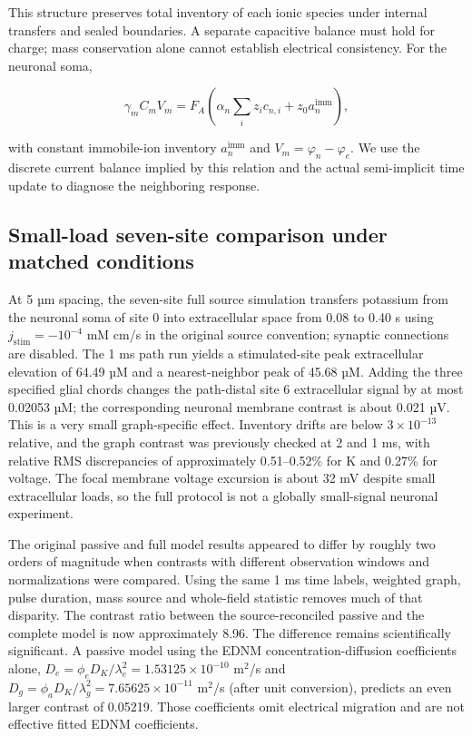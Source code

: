 \documentclass[
  11pt,
]{article}
\begin{document}
This structure preserves total inventory of each ionic species under
internal transfers and sealed boundaries. A separate capacitive balance
must hold for charge; mass conservation alone cannot establish
electrical consistency. For the neuronal soma,

\[\gamma_m C_m V_m=F_{\!A}\left(\alpha_n\sum_i z_i c_{n,i}+z_0a_n^{\mathrm{imm}}\right),\]

with constant immobile-ion inventory \(a_n^{\mathrm{imm}}\) and
\(V_m=\varphi_n-\varphi_e\). We use the discrete current balance implied
by this relation and the actual semi-implicit time update to diagnose
the neighboring response.

\subsection{Small-load seven-site comparison under matched
conditions}\label{small-load-seven-site-comparison-under-matched-conditions}

At 5 µm spacing, the seven-site full source simulation transfers
potassium from the neuronal soma of site 0 into extracellular space from
0.08 to 0.40 s using \(j_{\mathrm{stim}}=-10^{-4}\) mM cm/s in the
original source convention; synaptic connections are disabled. The 1 ms
path run yields a stimulated-site peak extracellular elevation of 64.49
µM and a nearest-neighbor peak of 45.68 µM. Adding the three specified
glial chords changes the path-distal site 6 extracellular signal by at
most 0.02053 µM; the corresponding neuronal membrane contrast is about
0.021 µV. This is a very small graph-specific effect. Inventory drifts
are below \(3\times10^{-13}\) relative, and the graph contrast was
previously checked at 2 and 1 ms, with relative RMS discrepancies of
approximately 0.51--0.52\% for K and 0.27\% for voltage. The focal
membrane voltage excursion is about 32 mV despite small extracellular
loads, so the full protocol is not a globally small-signal neuronal
experiment.

The original passive and full model results appeared to differ by
roughly two orders of magnitude when contrasts with different
observation windows and normalizations were compared. Using the same 1
ms time labels, weighted graph, pulse duration, mass source and
whole-field statistic removes much of that disparity. The contrast ratio
between the source-reconciled passive and the complete model is now
approximately 8.96. The difference remains scientifically significant. A
passive model using the EDNM concentration-diffusion coefficients alone,
\(D_e=\phi_e D_K/\lambda_e^2=1.53125\times10^{-10}\) m\(^2\)/s and
\(D_g=\phi_a D_K/\lambda_g^2=7.65625\times10^{-11}\) m\(^2\)/s (after
unit conversion), predicts an even larger contrast of 0.05219. Those
coefficients omit electrical migration and are not effective fitted EDNM
coefficients.
\end{document}
